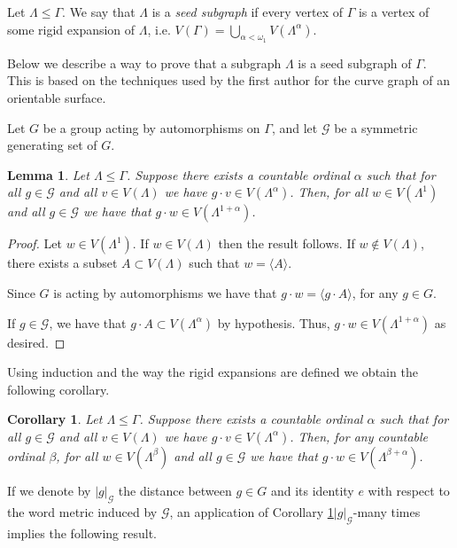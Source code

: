 \documentclass{artv3}
\newtheorem{lemma}[theorem]{Lemma}
\newtheorem{corollary}[theorem]{Corollary}
\begin{document}
Let $\Lambda \leq \Gamma$. We say that $\Lambda$ is a \emph{seed subgraph} if every vertex of $\Gamma$ is a vertex of some rigid expansion of $\Lambda$, i.e. $V(\Gamma) = \bigcup_{\alpha < \omega_1} V(\Lambda^{\alpha}).$

Below we describe a way to prove that a subgraph $\Lambda$ is a seed subgraph of $\Gamma$. This is based on the techniques used by the first author \cite{JHH1} for the curve graph of an orientable surface.

Let $G$ be a group acting by automorphisms on $\Gamma$, and let $\mathcal{G}$ be a symmetric generating set of $G$.

\begin{lemma}\label{lemma:gensetYinYk+1}
 Let $\Lambda \leq \Gamma$. Suppose there exists a countable ordinal $\alpha$ such that for all $g \in \mathcal{G}$ and all $v \in V(\Lambda)$ we have $g \cdot v \in V(\Lambda^{\alpha})$. Then, for all $w \in V(\Lambda^{1})$ and all $g \in \mathcal{G}$ we have that $g \cdot w \in V(\Lambda^{1 + \alpha})$.
\end{lemma}
\begin{proof}
 Let $w \in V(\Lambda^{1})$. If $w \in V(\Lambda)$ then the result follows. If $w \notin V(\Lambda)$, there exists a subset $A \subset V(\Lambda)$ such that $w = \langle A \rangle$.
 
 Since $G$ is acting by automorphisms we have that $g \cdot w = \langle g \cdot A \rangle$, for any $g \in G$.
 
 If $g \in \mathcal{G}$, we have that $g \cdot A \subset V(\Lambda^{\alpha})$ by hypothesis. Thus, $g \cdot w \in V(\Lambda^{1+\alpha})$ as desired.
\end{proof}

Using induction and the way the rigid expansions are defined we obtain the following corollary.

\begin{corollary}\label{cor:gensetYinYk+alpha}
 Let $\Lambda \leq \Gamma$. Suppose there exists a countable ordinal $\alpha$ such that for all $g \in \mathcal{G}$ and all $v \in V(\Lambda)$ we have $g \cdot v \in V(\Lambda^{\alpha})$. Then, for any countable ordinal $\beta$, for all $w \in V(\Lambda^{\beta})$ and all $g \in \mathcal{G}$ we have that $g \cdot w \in V(\Lambda^{\beta + \alpha})$.
\end{corollary}

If we denote by $|g|_{\mathcal{G}}$ the distance between $g \in G$ and its identity $e$ with respect to the word metric induced by $\mathcal{G}$, an application of Corollary \ref{cor:gensetYinYk+alpha}$|g|_{\mathcal{G}}$-many times implies the following result.
\end{document}
